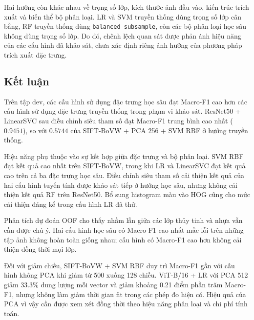 Hai hướng còn khác nhau về trọng số lớp, kích thước ảnh đầu vào, kiến trúc trích xuất và biến thể bộ phân loại. LR và SVM truyền thống dùng trọng số lớp cân bằng, RF truyền thống dùng \texttt{balanced\_subsample}, còn các bộ phân loại học sâu không dùng trọng số lớp. Do đó, chênh lệch quan sát được phản ánh hiệu năng của các cấu hình đã khảo sát, chưa xác định riêng ảnh hưởng của phương pháp trích xuất đặc trưng.

\subsection{Kết luận}
\label{sec:concl}
Trên tập dev, các cấu hình sử dụng đặc trưng học sâu đạt Macro-F1 cao hơn các cấu hình sử dụng đặc trưng truyền thống trong phạm vi khảo sát. ResNet50 + LinearSVC sau điều chỉnh siêu tham số đạt Macro-F1 trung bình cao nhất ($0.9451$), so với $0.5744$ của SIFT-BoVW + PCA 256 + SVM RBF ở hướng truyền thống.

Hiệu năng phụ thuộc vào sự kết hợp giữa đặc trưng và bộ phân loại. SVM RBF đạt kết quả cao nhất trên SIFT-BoVW, trong khi LR và LinearSVC đạt kết quả cao trên cả ba đặc trưng học sâu. Điều chỉnh siêu tham số cải thiện kết quả của hai cấu hình tuyến tính được khảo sát tiếp ở hướng học sâu, nhưng không cải thiện kết quả RF trên ResNet50. Bổ sung histogram màu vào HOG cũng cho mức cải thiện đáng kể trong cấu hình LR đã thử.

Phân tích dự đoán OOF cho thấy nhầm lẫn giữa các lớp thủy tinh và nhựa vẫn cần được chú ý. Hai cấu hình học sâu có Macro-F1 cao nhất mắc lỗi trên những tập ảnh không hoàn toàn giống nhau; cấu hình có Macro-F1 cao hơn không cải thiện đồng thời mọi lớp.

Đối với giảm chiều, SIFT-BoVW + SVM RBF duy trì Macro-F1 gần với cấu hình không PCA khi giảm từ 500 xuống 128 chiều. ViT-B/16 + LR với PCA 512 giảm 33.3\% dung lượng mỗi vector và giảm khoảng 0.21 điểm phần trăm Macro-F1, nhưng không làm giảm thời gian fit trong các phép đo hiện có. Hiệu quả của PCA vì vậy cần được xem xét đồng thời theo hiệu năng phân loại và chi phí tính toán.
